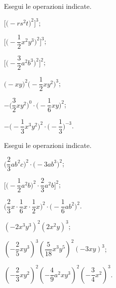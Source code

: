 \begin{esercizio}[\Ast]
 \label{ese:10.18} %
 Esegui le operazioni indicate.
\begin{multicols}{2}
\begin{enumeratea}
\spazielenx
 \item $\bigg[\big(-rs^{2}t\big)^{2}\bigg]^{3}$;
 \item $\Bigg[\bigg(-{\dfrac{1}{2}}x^{2}y^{3}\bigg)^{2}\Bigg]^{3}$;
 \item $\Bigg[\bigg(-{\dfrac{3}{2}}a^{2}b^{3}\bigg)^{2}\Bigg]^{2}$;
 \item $\big(-xy\big)^{2}\bigg(-{\dfrac{1}{2}}xy^{2}\bigg)^{3}$;
 \item $-\bigg(\dfrac{3}{2}xy^{2}\bigg)^{0}\cdot\bigg(-{\dfrac{1}{6}}xy\bigg)^{2}$;
 \item $-\bigg(-{\dfrac{1}{3}}x^{3}y^{2}\bigg)^{2}\cdot\bigg(-{\dfrac{1}{3}}\bigg)^{-3}$.
\end{enumeratea}
\end{multicols}
\end{esercizio}
\pagebreak
\begin{esercizio}[\Ast]
 \label{ese:10.19} %
 Esegui le operazioni indicate.
\begin{multicols}{2}
\begin{enumeratea}
\spazielenx
 \item $\bigg(\dfrac{2}{3}ab^{2}c\bigg)^{2}\cdot\big(-3ab^{3}\big)^{2}$;
 \item $\Bigg[\bigg(-{\dfrac{1}{2}}a^{2}b\bigg)^{2}\cdot{\dfrac{2}{3}a^{2}b}\Bigg]^{2}$;
 \item $\bigg(\dfrac{2}{3}x\cdot{\dfrac{1}{6}}x\cdot {\dfrac{1}{2}}x\bigg)^{2}\cdot\bigg(-{\dfrac{1}{6}}ab^{2}\bigg)^{2}$.
 \item $\left(-2x^3y^3\right)^2\left(2x^2y\right)^3$;
 \item $\left(-\dfrac{2}{5}xy^3\right)^3\left(\dfrac{5}{18}x^3y^5\right)^2\left(-3xy\right)^3$;
 \item $\left(-\dfrac{2}{3}xy^2\right)^2\left(-\dfrac{4}{9}a^2xy^3\right)^2\left(-\dfrac{3}{4}x^2\right)^3$.
\end{enumeratea}
\end{multicols}
\end{esercizio}

